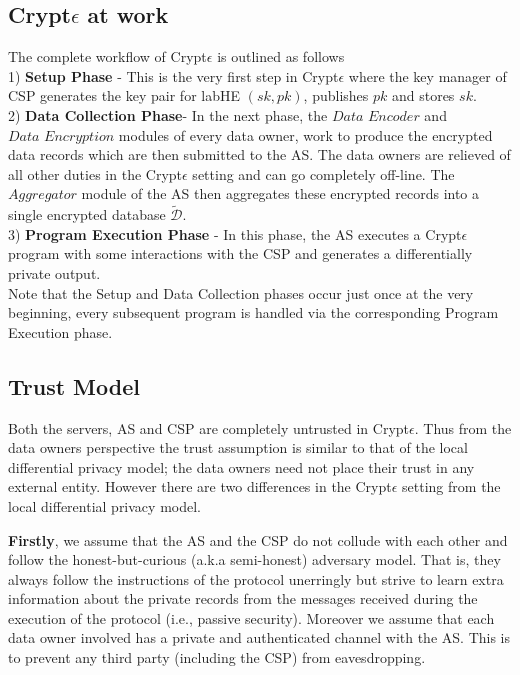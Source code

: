 \subsection{Crypt$\epsilon$ at work}
The complete workflow of Crypt$\epsilon$ is outlined as follows\\1) \textbf{\textsf{Setup Phase}} - This is the very first step in Crypt$\epsilon$ where the key manager of \textsf{CSP} generates the key pair for labHE $(sk,pk)$, publishes $pk$ and stores $sk$. \\2) \textbf{\textsf{Data Collection Phase}}- In the next phase, the $\textit{Data 
Encoder}$ and $\textit{Data Encryption}$ modules of every data owner, work to produce the encrypted data records which are then submitted to the \textsf{AS}. The data owners are relieved of all other duties in the Crypt$\epsilon$ setting and can go completely off-line. The $\textit{Aggregator}$ module of the \textsf{AS} then aggregates these encrypted records into a single encrypted database $\boldsymbol{\tilde{\mathcal{D}}}$. \\3) \textbf{\textsf{ Program Execution Phase}} - In this phase, the \textsf{AS} executes a Crypt$\epsilon$ program with some interactions with the \textsf{CSP}  and generates a differentially private output.  \\
Note that the \textsf{Setup} and \textsf{Data Collection} phases occur just once at the very beginning, every subsequent program  is handled via the corresponding  \textsf{Program Execution} phase.
\subsection{Trust Model}
Both the servers, \textsf{AS} and \textsf{CSP} are completely untrusted in Crypt$\epsilon$. 
Thus from the data owners perspective the trust assumption is similar to that of the local differential privacy model; the data owners need not place their trust in any external entity. 
However there are two differences in the Crypt$\epsilon$ setting from the local differential privacy model.

 \textbf{Firstly}, we assume that the \textsf{AS} and the \textsf{CSP} do not collude with each other and follow the honest-but-curious (a.k.a semi-honest) adversary model. That is, they always follow the instructions of the protocol unerringly but strive to learn extra information about the private records from the messages received during the execution of the protocol (i.e., passive security). Moreover we assume that each data owner involved has a private and authenticated channel with the \textsf{AS}. This is to prevent any third party (including the \textsf{CSP}) from eavesdropping. 
 
